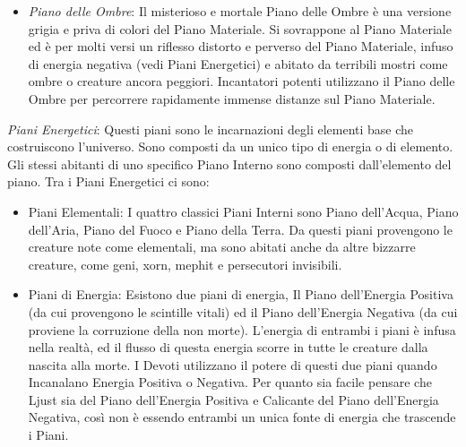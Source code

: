 \documentclass[a4paper,twoside,openany]{book}
\begin{document}
\begin{multicols}{2}
\begin{itemize}[leftmargin=*]
	\item
	\emph{Piano delle Ombre}: Il misterioso e mortale Piano delle Ombre è una versione grigia e priva di colori del Piano Materiale. Si sovrappone al Piano Materiale ed è per molti versi un riflesso distorto e perverso del Piano Materiale, infuso di energia negativa (vedi Piani Energetici) e abitato da terribili mostri come ombre o creature ancora peggiori. Incantatori potenti utilizzano il Piano delle Ombre per percorrere rapidamente immense distanze sul Piano Materiale.
\end{itemize}

\medskip

\emph{Piani Energetici}: Questi piani sono le incarnazioni degli elementi base che costruiscono l'universo. Sono composti da un unico tipo di energia o di elemento. Gli stessi abitanti di uno specifico Piano Interno sono composti dall'elemento del piano. Tra i Piani Energetici ci sono:

\medskip

\begin{itemize}[leftmargin=*] \setlength{\itemsep}{0pt}
	\item
	Piani Elementali: I quattro classici Piani Interni sono Piano dell'Acqua, Piano dell'Aria, Piano del Fuoco e Piano della Terra. Da questi piani provengono le creature note come elementali, ma sono abitati anche da altre bizzarre creature, come geni, xorn, mephit e persecutori invisibili.

	\item
	Piani di Energia: Esistono due piani di energia, Il Piano dell'Energia Positiva (da cui provengono le scintille vitali) ed il Piano dell'Energia Negativa (da cui proviene la corruzione della non morte). L'energia di entrambi i piani è infusa nella realtà, ed il flusso di questa energia scorre in tutte le creature dalla nascita alla morte. I Devoti utilizzano il potere di questi due piani quando Incanalano Energia Positiva o Negativa. Per quanto sia facile pensare che Ljust sia del Piano dell'Energia Positiva e Calicante del Piano dell'Energia Negativa, così non è essendo entrambi un unica fonte di energia che trascende i Piani.

\end{itemize}




\end{multicols}
\end{document}
